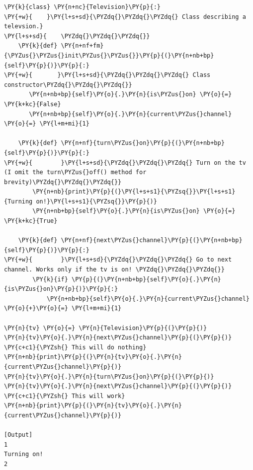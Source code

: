 \begin{Verbatim}[label=\makebox{\url{https://github.com/lucabaldini/cmepda/tree/master/slides/latex/snippets/class\_tv\_zapping.py}},commandchars=\\\{\}]
\PY{k}{class} \PY{n+nc}{Television}\PY{p}{:}
\PY{+w}{    }\PY{l+s+sd}{\PYZdq{}\PYZdq{}\PYZdq{} Class describing a televsion.}
\PY{l+s+sd}{    \PYZdq{}\PYZdq{}\PYZdq{}}
    \PY{k}{def} \PY{n+nf+fm}{\PYZus{}\PYZus{}init\PYZus{}\PYZus{}}\PY{p}{(}\PY{n+nb+bp}{self}\PY{p}{)}\PY{p}{:}
\PY{+w}{       }\PY{l+s+sd}{\PYZdq{}\PYZdq{}\PYZdq{} Class constructor\PYZdq{}\PYZdq{}\PYZdq{}}
       \PY{n+nb+bp}{self}\PY{o}{.}\PY{n}{is\PYZus{}on} \PY{o}{=} \PY{k+kc}{False}
       \PY{n+nb+bp}{self}\PY{o}{.}\PY{n}{current\PYZus{}channel} \PY{o}{=} \PY{l+m+mi}{1}       
    
    \PY{k}{def} \PY{n+nf}{turn\PYZus{}on}\PY{p}{(}\PY{n+nb+bp}{self}\PY{p}{)}\PY{p}{:}
\PY{+w}{        }\PY{l+s+sd}{\PYZdq{}\PYZdq{}\PYZdq{} Turn on the tv (I omit the turn\PYZus{}off() method for brevity)\PYZdq{}\PYZdq{}\PYZdq{}}
        \PY{n+nb}{print}\PY{p}{(}\PY{l+s+s1}{\PYZsq{}}\PY{l+s+s1}{Turning on!}\PY{l+s+s1}{\PYZsq{}}\PY{p}{)}
        \PY{n+nb+bp}{self}\PY{o}{.}\PY{n}{is\PYZus{}on} \PY{o}{=} \PY{k+kc}{True}

    \PY{k}{def} \PY{n+nf}{next\PYZus{}channel}\PY{p}{(}\PY{n+nb+bp}{self}\PY{p}{)}\PY{p}{:}
\PY{+w}{        }\PY{l+s+sd}{\PYZdq{}\PYZdq{}\PYZdq{} Go to next channel. Works only if the tv is on! \PYZdq{}\PYZdq{}\PYZdq{}}
        \PY{k}{if} \PY{p}{(}\PY{n+nb+bp}{self}\PY{o}{.}\PY{n}{is\PYZus{}on}\PY{p}{)}\PY{p}{:}
            \PY{n+nb+bp}{self}\PY{o}{.}\PY{n}{current\PYZus{}channel} \PY{o}{+}\PY{o}{=} \PY{l+m+mi}{1}

\PY{n}{tv} \PY{o}{=} \PY{n}{Television}\PY{p}{(}\PY{p}{)}
\PY{n}{tv}\PY{o}{.}\PY{n}{next\PYZus{}channel}\PY{p}{(}\PY{p}{)} \PY{c+c1}{\PYZsh{} This will do nothing}
\PY{n+nb}{print}\PY{p}{(}\PY{n}{tv}\PY{o}{.}\PY{n}{current\PYZus{}channel}\PY{p}{)}
\PY{n}{tv}\PY{o}{.}\PY{n}{turn\PYZus{}on}\PY{p}{(}\PY{p}{)}
\PY{n}{tv}\PY{o}{.}\PY{n}{next\PYZus{}channel}\PY{p}{(}\PY{p}{)} \PY{c+c1}{\PYZsh{} This will work}
\PY{n+nb}{print}\PY{p}{(}\PY{n}{tv}\PY{o}{.}\PY{n}{current\PYZus{}channel}\PY{p}{)}

[Output]
1
Turning on!
2
\end{Verbatim}